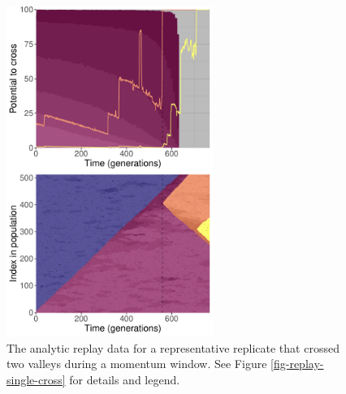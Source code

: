 \begin{figure}[h!]
\begin{center}
\includegraphics[width=0.6\textwidth]{05_adaptive_momentum/media/reps/263/script_06__plot_03__combined_plot_area.pdf}
\caption{
    The analytic replay data for a representative replicate that crossed two valleys during a momentum window. 
    See Figure \ref{fig-replay-single-cross} for details and legend. 
}
\label{fig-replay-double-cross}
\end{center}
\end{figure}


